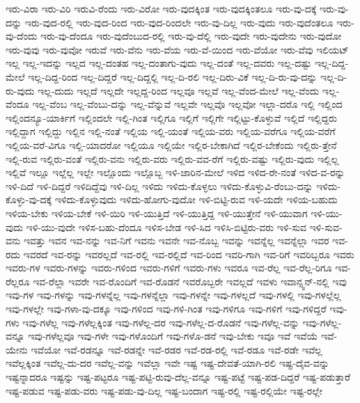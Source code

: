 {ಇರು-ವಿರಾ
ಇರು-ವಿರಿ
ಇರುವಿ-ರೆಂದು
ಇರು-ವಿರೋ
ಇರು-ವುದಕ್ಕಿಂತ
ಇರು-ವುದಕ್ಕಿಂತಲೂ
ಇರು-ವು-ದಕ್ಕೆ
ಇರು-ವು-ದನ್ನು
ಇರು-ವುದ-ರಲ್ಲಿ
ಇರು-ವುದ-ರಿಂದ
ಇರು-ವುದ-ರಿಂದಲೇ
ಇರು-ವು-ದಿಲ್ಲ
ಇರು-ವುದು
ಇರು-ವುದೆಂತಲೂ
ಇರು-ವು-ದೆಂದು
ಇರು-ವು-ದೆಂದೂ
ಇರು-ವುದೆಂಬುದ-ರಲ್ಲಿ
ಇರು-ವು-ದೆಲ್ಲಿ
ಇರು-ವುದೇ
ಇರು-ವುದೇನು
ಇರು-ವುದೋ
ಇರು-ವುವು
ಇರು-ವುವೋ
ಇರುವೆ
ಇರು-ವೆನು
ಇರು-ವೆಯ
ಇರು-ವೆ-ಯಿಂದ
ಇರು-ವೆಯೋ
ಇರು-ವೆವು
ಇಲಿಯಟ್
ಇಲ್ಲ
ಇಲ್ಲ-ಇದನ್ನು
ಇಲ್ಲದ
ಇಲ್ಲ-ದಂತಹ
ಇಲ್ಲ-ದಂತಾಗು-ವುದು
ಇಲ್ಲ-ದಂತೆ
ಇಲ್ಲ-ದವರು
ಇಲ್ಲ-ದಷ್ಟು
ಇಲ್ಲ-ದಿದ್ದ-ಮೇಲೆ
ಇಲ್ಲ-ದಿದ್ದ-ರಿಂದ
ಇಲ್ಲ-ದಿದ್ದರೆ
ಇಲ್ಲ-ದಿದ್ದಲ್ಲಿ
ಇಲ್ಲ-ದಿ-ರಲಿ
ಇಲ್ಲ-ದಿರು-ವಿಕೆ
ಇಲ್ಲ-ದಿ-ರು-ವು-ದನ್ನು
ಇಲ್ಲ-ದಿ-ರು-ವುದು
ಇಲ್ಲ-ದುದು
ಇಲ್ಲದೆ
ಇಲ್ಲದೇ
ಇಲ್ಲದ್ದ-ರಿಂದ
ಇಲ್ಲವೂ
ಇಲ್ಲವೆ
ಇಲ್ಲ-ವೆಂದ-ಮೇಲೆ
ಇಲ್ಲ-ವೆಂದು
ಇಲ್ಲ-ವೆಂದೂ
ಇಲ್ಲ-ವೆಂಬ
ಇಲ್ಲ-ವೆಂಬು-ದನ್ನು
ಇಲ್ಲ-ವೆನ್ನುವೆ
ಇಲ್ಲವೇ
ಇಲ್ಲವೊ
ಇಲ್ಲವೋ
ಇಲ್ಲಾ-ದರೊ
ಇಲ್ಲಿ
ಇಲ್ಲಿಂದ
ಇಲ್ಲಿಂದನ್ಯೂ-ಯಾರ್ಕಿಗೆ
ಇಲ್ಲಿಂದಲೇ
ಇಲ್ಲಿ-ಗಿಂತ
ಇಲ್ಲಿಗೂ
ಇಲ್ಲಿಗೆ
ಇಲ್ಲಿಗೇ
ಇಲ್ಲಿಟ್ಟು-ಕೊಳ್ಳುವೆ
ಇಲ್ಲಿದೆ
ಇಲ್ಲಿದ್ದರು
ಇಲ್ಲಿದ್ದಾಗ
ಇಲ್ಲಿದ್ದು
ಇಲ್ಲಿನ
ಇಲ್ಲಿ-ನಂತೆ
ಇಲ್ಲಿಯ
ಇಲ್ಲಿ-ಯಂತೆ
ಇಲ್ಲಿಯ-ವರು
ಇಲ್ಲಿಯ-ವರೆಗೂ
ಇಲ್ಲಿಯ-ವರೆಗೆ
ಇಲ್ಲಿಯ-ವರೆ-ವಿಗೂ
ಇಲ್ಲಿ-ಯಾದರೋ
ಇಲ್ಲಿಯೂ
ಇಲ್ಲಿಯೇ
ಇಲ್ಲಿರ-ಬೇಕಾಗಿದೆ
ಇಲ್ಲಿರ-ಬೇಕೆಂದು
ಇಲ್ಲಿರು-ತ್ತೇನೆ
ಇಲ್ಲಿ-ರುವ
ಇಲ್ಲಿರು-ವಂತೆ
ಇಲ್ಲಿರು-ವನು
ಇಲ್ಲಿರು-ವರು
ಇಲ್ಲಿರು-ವವ-ರೆಗೆ
ಇಲ್ಲಿರು-ವಷ್ಟು
ಇಲ್ಲಿರು-ವುದು
ಇಲ್ಲಿಲ್ಲ
ಇಲ್ಲಿವೆ
ಇಲ್ಲೂ
ಇಲ್ಲೆಲ್ಲ
ಇಲ್ಲೇ
ಇಲ್ಲೊಂದು
ಇಲ್ಲೊಬ್ಬ
ಇಳಿ-ಜಾರಿನ-ಮೇಲೆ
ಇಳಿದ
ಇಳಿದ-ರೇ-ನಂತೆ
ಇಳಿದ-ವ-ರನ್ನು
ಇಳಿ-ದಿದೆ
ಇಳಿ-ದಿದ್ದರೆ
ಇಳಿದಿದ್ದೆವು
ಇಳಿ-ದಿಲ್ಲ
ಇಳಿದು
ಇಳಿದು-ಕೊಳ್ಳಲು
ಇಳಿದು-ಕೊಳ್ಳುವಿ-ರೆಂಬು-ದನ್ನು
ಇಳಿದು-ಕೊಳ್ಳು-ವು-ದಕ್ಕೆ
ಇಳಿದು-ಕೊಳ್ಳುವುದು
ಇಳಿದು-ಹೋಗು-ವುದೋ
ಇಳಿ-ಬಿಟ್ಟಿ-ರುವ
ಇಳಿ-ಯದೇ
ಇಳಿಯ-ಬಹುದು
ಇಳಿಯ-ಬೇಕು
ಇಳಿಯ-ಬೇಕೆ
ಇಳಿ-ಯಿರಿ
ಇಳಿ-ಯುತ್ತಿದೆ
ಇಳಿ-ಯುತ್ತಿದ್ದ
ಇಳಿ-ಯುತ್ತೇನೆ
ಇಳಿ-ಯುವಾಗ
ಇಳಿ-ಯು-ವುದು
ಇಳಿ-ಯು-ವುದೇ
ಇಳಿಸ-ಬಹು-ದೆಂದೂ
ಇಳಿಸ-ಬೇಡ
ಇಳಿ-ಸಿದ
ಇಳಿಸಿ-ಬಿಟ್ಟಿರು-ವರು
ಇಳಿ-ಸುವ
ಇಳಿ-ಸುವ-ವನು
ಇವತ್ತು
ಇವನ
ಇವ-ನನ್ನು
ಇವ-ನಿಗೆ
ಇವನು
ಇವನೇ
ಇವ-ನೊಬ್ಬ
ಇವನ್ನು
ಇವನ್ನೆಲ್ಲ
ಇವನ್ನೆಲ್ಲಾ
ಇವರ
ಇವ-ರದು
ಇವರದೆ
ಇವ-ರನ್ನು
ಇವರಲ್ಲದೆ
ಇವ-ರಲ್ಲಿ
ಇವ-ರಲ್ಲಿದೆ
ಇವ-ರಿಂದ
ಇವರಿ-ಗಾಗಿ
ಇವ-ರಿಗೆ
ಇವರಿಬ್ಬರೂ
ಇವರು
ಇವರು-ಗಳ
ಇವರು-ಗಳನ್ನು
ಇವರು-ಗಳಿಂದ
ಇವರು-ಗಳಿಗೆ
ಇವರು-ಗಳು
ಇವರೂ
ಇವ-ರೆಲ್ಲ
ಇವ-ರೆಲ್ಲ-ರಿಗೂ
ಇವ-ರೆಲ್ಲರೂ
ಇವ-ರೆಲ್ಲಾ
ಇವರೇ
ಇವ-ರೊಂದಿಗೆ
ಇವ-ರೊಡನೆ
ಇವರೊಬ್ಬರೇ
ಇವಲ್ಲದೆ
ಇವಳು
ಇವಾನ್ಸ್ವನ್-ನಲ್ಲಿ
ಇವು
ಇವು-ಗಳ
ಇವು-ಗಳನ್ನು
ಇವು-ಗಳನ್ನೆಲ್ಲ
ಇವು-ಗಳನ್ನೆಲ್ಲಾ
ಇವು-ಗಳನ್ನೇ
ಇವು-ಗಳಲ್ಲದೆ
ಇವು-ಗಳಲ್ಲಿ
ಇವು-ಗಳಲ್ಲೆಲ್ಲ
ಇವು-ಗಳಲ್ಲೇ
ಇವು-ಗಳಾ-ವು-ದಕ್ಕೂ
ಇವು-ಗಳಿಂದ
ಇವು-ಗಳಿ-ಗಿಂತ
ಇವು-ಗಳಿಗೂ
ಇವು-ಗಳಿಗೆ
ಇವು-ಗಳಿದ್ದರೆ
ಇವು-ಗಳು
ಇವು-ಗಳೆಲ್ಲ
ಇವು-ಗಳೆಲ್ಲಕ್ಕಿಂತ
ಇವು-ಗಳೆಲ್ಲ-ದರ
ಇವು-ಗಳೆಲ್ಲ-ದ-ರೊಡನೆ
ಇವು-ಗಳೆಲ್ಲ-ವನ್ನು
ಇವು-ಗಳೆಲ್ಲ-ವನ್ನೂ
ಇವು-ಗಳೆಲ್ಲವೂ
ಇವು-ಗಳೇ
ಇವು-ಗಳೊಂದಿಗೆ
ಇವು-ಗಳೊ-ಡನೆ
ಇವು-ಬೇಕು
ಇವೂ
ಇವೆ
ಇವೆಯೆ
ಇವೆ-ಯೇನು
ಇವೆಯೋ
ಇವೆ-ರಡನ್ನೂ
ಇವೆ-ರಡನ್ನೇ
ಇವೆ-ರಡರ
ಇವೆ-ರಡ-ರಲ್ಲಿ
ಇವೆ-ರಡೂ
ಇವೆ-ರಡೇ
ಇವೆಲ್ಲ
ಇವೆಲ್ಲಕ್ಕಿಂತ
ಇವೆಲ್ಲ-ದು-ದರ
ಇವೆಲ್ಲ-ವನ್ನು
ಇವೆಲ್ಲಾ
ಇವೇ
ಇಷ್ಟ
ಇಷ್ಟ-ದೇವತೆ-ಯಾಗಿ-ರಲಿ
ಇಷ್ಟ-ದೈವ-ವನ್ನು
ಇಷ್ಟನ್ನಾದರೂ
ಇಷ್ಟನ್ನು
ಇಷ್ಟ-ಪಟ್ಟರೂ
ಇಷ್ಟ-ಪಟ್ಟಿ-ರುವು-ದೆಲ್ಲ-ವನ್ನೂ
ಇಷ್ಟ-ಪಟ್ಟೆ
ಇಷ್ಟ-ಪಡ-ದಿದ್ದರೆ
ಇಷ್ಟ-ಪಡುತ್ತಾರೆ
ಇಷ್ಟ-ಪಡುವ
ಇಷ್ಟ-ಪಡು-ವರು
ಇಷ್ಟ-ಪಡು-ವು-ದಿಲ್ಲ
ಇಷ್ಟ-ಬಂದಾಗ
ಇಷ್ಟ-ರಲ್ಲಿ
ಇಷ್ಟ-ರಲ್ಲಿಯೇ
ಇಷ್ಟ-ರಲ್ಲೇ
}
